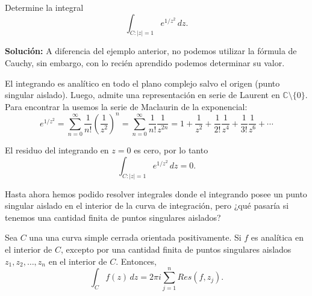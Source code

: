 \begin{ejemplo}
Determine la integral
$$\int_{C:|z| = 1} e^{1/z^2} \,dz.$$

\textbf{Solución:} A diferencia del ejemplo anterior, no podemos utilizar la fórmula de Cauchy, sin embargo, con lo recién aprendido podemos determinar su valor. 

El integrando es analítico en todo el plano complejo salvo el origen (punto singular aislado). Luego, admite una representación en serie de Laurent en $\mathbb{C} \setminus \{0\}$. Para encontrar la usemos la serie de Maclaurin de la exponencial:
$$e^{1/z^2} = \sum_{n=0}^{\infty} \frac{1}{n!} \left(\frac{1}{z^2} \right)^n = \sum_{n=0}^{\infty} \frac{1}{n!} \frac{1}{z^{2n}} = 1 + \frac{1}{z^2} + \frac{1}{2!} \frac{1}{z^4} + \frac{1}{3!} \frac{1}{z^6} + \cdots$$

El residuo del integrando en $z = 0$ es cero, por lo tanto
$$\int_{C:|z| = 1} e^{1/z^2} \,dz = 0.$$
\end{ejemplo}

Hasta ahora hemos podido resolver integrales donde el integrando posee un punto singular aislado en el interior de la curva de integración, pero ¿qué pasaría si tenemos una cantidad finita de puntos singulares aislados?

\begin{teorema}[de Residuos]
Sea $C$ una una curva simple cerrada orientada positivamente. Si $f$ es analítica en el interior de $C$, excepto por una cantidad finita de puntos singulares aislados $z_1, z_2, \dots, z_n$ en el interior de $C$. Entonces,
$$\int_C f(z) \,dz = 2\pi i \sum_{j=1}^n Res(f,z_j).$$
\end{teorema}

